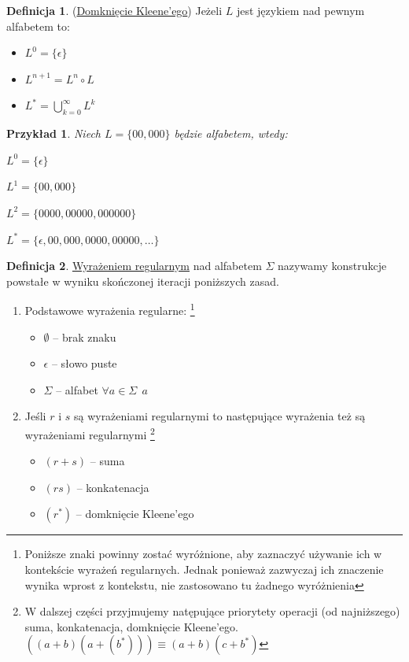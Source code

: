 \documentclass[12pt,a4paper]{article}
\newtheorem{przyklad}{Przykład}
\theoremstyle{definition}
\newtheorem{df}{Definicja}
\theoremstyle{remark}
\begin{document}
	\begin{df}(\href{http://pl.wikipedia.org/wiki/Domkni%C4%99cie_Kleene'ego}{Domknięcie Kleene'ego}) Jeżeli $L$ jest językiem nad pewnym alfabetem to:
		\begin{itemize}
			\item $L^0 = \{\epsilon\}$
			\item $L^{n+1} = L^n \circ L$
			\item $L^* = \bigcup_{k=0}^\infty L^k$
		\end{itemize}
	\end{df}	
	
	\begin{przyklad}
		Niech $L = \{00, 000\}$ będzie alfabetem, wtedy:\\
		\begin{inparaenum} 
			\item $L^0 = \{\epsilon\}$
			\item $L^1 = \{00, 000\}$
			\item $L^2 = \{0000, 00000, 000000\}$
			\item $L^* = \{\epsilon, 00, 000, 0000, 00000, \dots\}$
		\end{inparaenum}
	\end{przyklad}
	
	\begin{df} \href{http://pl.wikipedia.org/wiki/Wyra%C5%BCenia_regularne}{Wyrażeniem regularnym} nad alfabetem $\Sigma$ nazywamy konstrukcje
	 powstałe w wyniku skończonej iteracji poniższych zasad.
		\begin{enumerate}
			\item Podstawowe wyrażenia regularne: \footnote{Poniższe znaki powinny zostać wyróżnione, aby zaznaczyć używanie ich w kontekście
			wyrażeń regularnych. Jednak ponieważ zazwyczaj ich znaczenie wynika wprost z kontekstu, nie zastosowano tu żadnego wyróżnienia}
				\begin{itemize}
					\item $\emptyset$ -- brak znaku
					\item $\epsilon$ -- słowo puste
					\item $\Sigma$ -- alfabet $\forall a\in\Sigma ~~ a$
				\end{itemize}
			\item Jeśli $r$ i $s$ są wyrażeniami regularnymi to następujące wyrażenia też są wyrażeniami regularnymi
				\footnote{W dalszej części przyjmujemy natępujące priorytety operacji (od najniższego) suma, konkatenacja, domknięcie Kleene'ego. 
				$((a+b)(a+(b^*))) \equiv (a+b)(c+b^*)$}
				\begin{itemize}
					\item $(r+s)$ -- suma
					\item $(rs)$ -- konkatenacja
					\item $(r^*)$ -- domknięcie Kleene'ego
				\end{itemize}
		\end{enumerate}		
	\end{df}	
	
\end{document}
